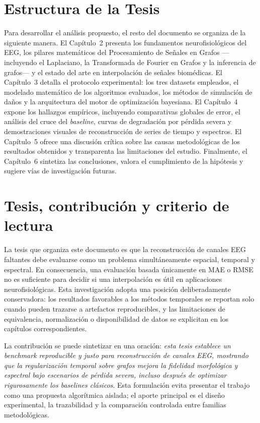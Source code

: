 \section{Estructura de la Tesis}

Para desarrollar el análisis propuesto, el resto del documento se organiza de la siguiente manera. El Capítulo~2 presenta los fundamentos neurofisiológicos del EEG, los pilares matemáticos del Procesamiento de Señales en Grafos ---incluyendo el Laplaciano, la Transformada de Fourier en Grafos y la inferencia de grafos--- y el estado del arte en interpolación de señales biomédicas. El Capítulo~3 detalla el protocolo experimental: los tres datasets empleados, el modelado matemático de los algoritmos evaluados, los métodos de simulación de daños y la arquitectura del motor de optimización bayesiana. El Capítulo~4 expone los hallazgos empíricos, incluyendo comparativas globales de error, el análisis del cruce del \textit{baseline}, curvas de degradación por pérdida severa y demostraciones visuales de reconstrucción de series de tiempo y espectros. El Capítulo~5 ofrece una discusión crítica sobre las causas metodológicas de los resultados obtenidos y transparenta las limitaciones del estudio. Finalmente, el Capítulo~6 sintetiza las conclusiones, valora el cumplimiento de la hipótesis y sugiere vías de investigación futuras.

\section{Tesis, contribución y criterio de lectura}
La tesis que organiza este documento es que la reconstrucción de canales EEG faltantes debe evaluarse como un problema simultáneamente espacial, temporal y espectral. En consecuencia, una evaluación basada únicamente en MAE o RMSE no es suficiente para decidir si una interpolación es útil en aplicaciones neurofisiológicas. Esta investigación adopta una posición deliberadamente conservadora: los resultados favorables a los métodos temporales se reportan solo cuando pueden trazarse a artefactos reproducibles, y las limitaciones de equivalencia, normalización o disponibilidad de datos se explicitan en los capítulos correspondientes.

La contribución se puede sintetizar en una oración: \emph{esta tesis establece un benchmark reproducible y justo para reconstrucción de canales EEG, mostrando que la regularización temporal sobre grafos mejora la fidelidad morfológica y espectral bajo escenarios de pérdida severa, incluso después de optimizar rigurosamente los baselines clásicos}. Esta formulación evita presentar el trabajo como una propuesta algorítmica aislada; el aporte principal es el diseño experimental, la trazabilidad y la comparación controlada entre familias metodológicas.
